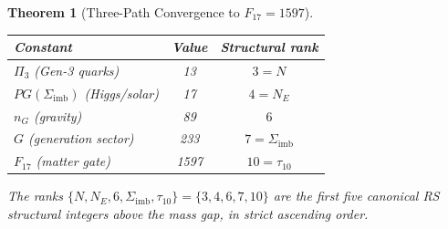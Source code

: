 \documentclass[11pt, letterpaper]{article}
\theoremstyle{definition}
\theoremstyle{plain}
\newtheorem{theorem}{Theorem}[section]
\begin{document}
\begin{theorem}[Three-Path Convergence to $F_{17} = 1597$]
\begin{center}
\begin{tabular}{lcc}
\hline
Constant & Value & Structural rank \\
\hline
$\Pi_3$ (Gen-3 quarks)      & 13   & $3 = N$              \\
$PG(\Sigma_{\mathrm{imb}})$ (Higgs/solar) & 17 & $4 = N_E$ \\
$n_G$ (gravity)             & 89   & $6$                  \\
$G$ (generation sector)     & 233  & $7 = \Sigma_{\mathrm{imb}}$ \\
$F_{17}$ (matter gate)      & 1597 & $10 = \tau_{10}$     \\
\hline
\end{tabular}
\end{center}

The ranks $\{N, N_E, 6, \Sigma_{\mathrm{imb}}, \tau_{10}\} = \{3, 4, 6, 7, 10\}$ are the
first five canonical RS structural integers above the mass gap, in strict ascending order.
\end{theorem}
\end{document}
